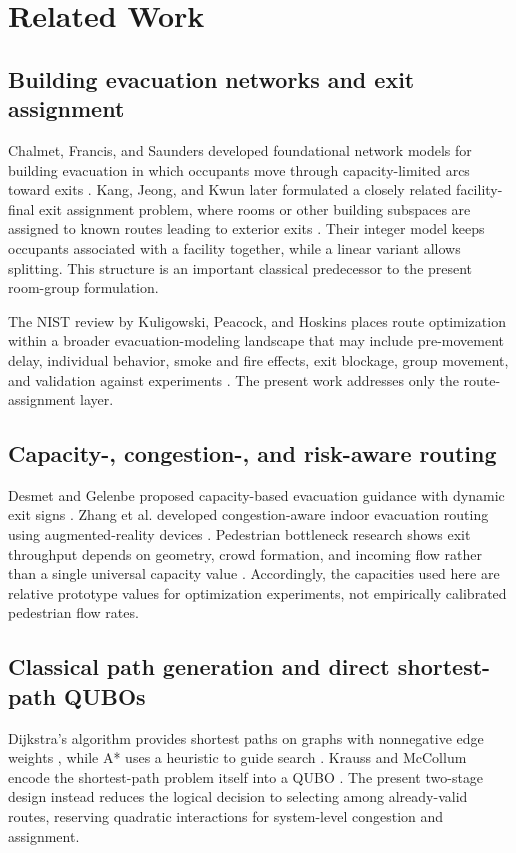 \documentclass[11pt]{article}
\begin{document}
\section{Related Work}

\subsection{Building evacuation networks and exit assignment}
Chalmet, Francis, and Saunders developed foundational network models for building evacuation in which occupants move through capacity-limited arcs toward exits \cite{chalmet}. Kang, Jeong, and Kwun later formulated a closely related facility-final exit assignment problem, where rooms or other building subspaces are assigned to known routes leading to exterior exits \cite{kang}. Their integer model keeps occupants associated with a facility together, while a linear variant allows splitting. This structure is an important classical predecessor to the present room-group formulation.

The NIST review by Kuligowski, Peacock, and Hoskins places route optimization within a broader evacuation-modeling landscape that may include pre-movement delay, individual behavior, smoke and fire effects, exit blockage, group movement, and validation against experiments \cite{kuligowski}. The present work addresses only the route-assignment layer.

\subsection{Capacity-, congestion-, and risk-aware routing}
Desmet and Gelenbe proposed capacity-based evacuation guidance with dynamic exit signs \cite{desmet}. Zhang et al. developed congestion-aware indoor evacuation routing using augmented-reality devices \cite{zhang}. Pedestrian bottleneck research shows exit throughput depends on geometry, crowd formation, and incoming flow rather than a single universal capacity value \cite{ye}. Accordingly, the capacities used here are relative prototype values for optimization experiments, not empirically calibrated pedestrian flow rates.

\subsection{Classical path generation and direct shortest-path QUBOs}
Dijkstra's algorithm provides shortest paths on graphs with nonnegative edge weights \cite{dijkstra}, while A* uses a heuristic to guide search \cite{astar}. Krauss and McCollum encode the shortest-path problem itself into a QUBO \cite{krauss}. The present two-stage design instead reduces the logical decision to selecting among already-valid routes, reserving quadratic interactions for system-level congestion and assignment.
\end{document}
